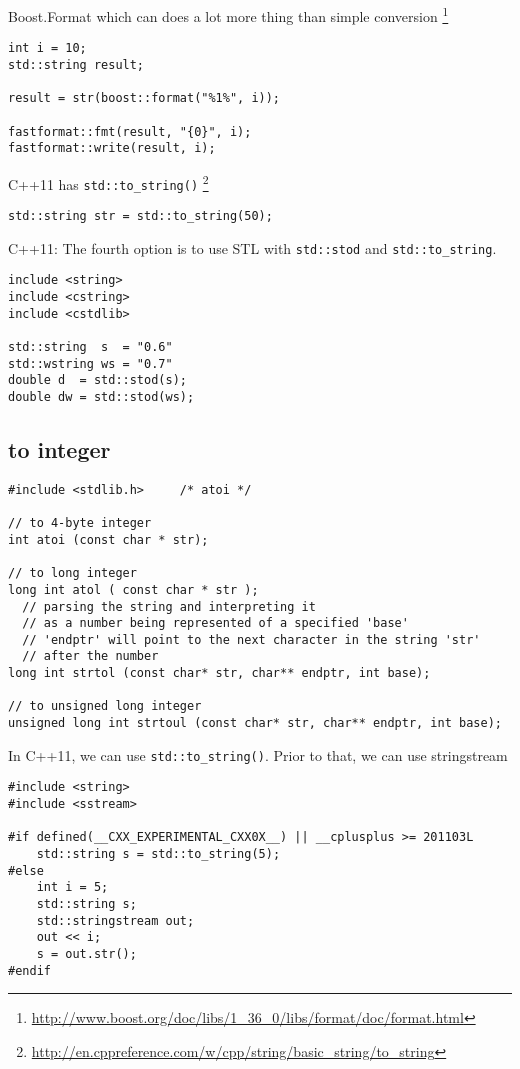 Boost.Format which can does a lot more thing than simple conversion
\footnote{\url{http://www.boost.org/doc/libs/1_36_0/libs/format/doc/format.html}}
\begin{verbatim}
int i = 10;
std::string result;

result = str(boost::format("%1%", i));

fastformat::fmt(result, "{0}", i);
fastformat::write(result, i);
\end{verbatim}


C++11 has \verb!std::to_string()!
\footnote{\url{http://en.cppreference.com/w/cpp/string/basic_string/to_string}}
\begin{verbatim}
std::string str = std::to_string(50);
\end{verbatim}

C++11: The fourth option is to use STL with \verb!std::stod! and
\verb!std::to_string!. 
\begin{verbatim}
include <string>
include <cstring>
include <cstdlib>

std::string  s  = "0.6"
std::wstring ws = "0.7"
double d  = std::stod(s);
double dw = std::stod(ws);
\end{verbatim}



\subsection{to integer}


\begin{verbatim}
#include <stdlib.h>     /* atoi */

// to 4-byte integer
int atoi (const char * str);

// to long integer
long int atol ( const char * str );
  // parsing the string and interpreting it 
  // as a number being represented of a specified 'base'
  // 'endptr' will point to the next character in the string 'str'
  // after the number
long int strtol (const char* str, char** endptr, int base);

// to unsigned long integer
unsigned long int strtoul (const char* str, char** endptr, int base);

\end{verbatim}

In C++11, we can use \verb!std::to_string()!. Prior to that, we can use
stringstream
\begin{verbatim}
#include <string>
#include <sstream>

#if defined(__CXX_EXPERIMENTAL_CXX0X__) || __cplusplus >= 201103L
	std::string s = std::to_string(5);
#else
	int i = 5;
	std::string s;
	std::stringstream out;
	out << i;
	s = out.str();
#endif
\end{verbatim}


